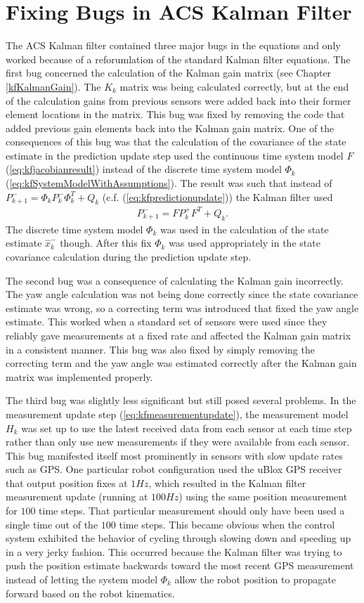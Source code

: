 \section{Fixing Bugs in ACS Kalman Filter}
\label{sec:kfBugs}
The ACS Kalman filter contained three major bugs in the equations and only worked because of a reforumlation of the standard Kalman filter equations. The first bug concerned the calculation of the Kalman gain matrix (see Chapter \ref{kfKalmanGain}). The $K_k$ matrix was being calculated correctly, but at the end of the calculation gains from previous sensors were added back into their former element locations in the matrix. This bug was fixed by removing the code that added previous gain elements back into the Kalman gain matrix. One of the consequences of this bug was that the calculation of the covariance of the state estimate in the prediction update step used the continuous time system model $F$ (\ref{eq:kfjacobianresult}) instead of the discrete time system model $\Phi_k$ (\ref{eq:kfSystemModelWithAssumptions}). The result was such that instead of $P_{k+1}^- = \Phi_kP_k^-\Phi_k^T + Q_k$ (c.f. (\ref{eq:kfpredictionupdate})) the Kalman filter used
\begin{align*}
P_{k+1}^- = FP_k^+F^T + Q_k.
\end{align*}
The discrete time system model $\Phi_k$ was used in the calculation of the state estimate $\hat{x}_k^-$ though. After this fix $\Phi_k$ was used appropriately in the state covariance calculation during the prediction update step.

The second bug was a consequence of calculating the Kalman gain incorrectly. The yaw angle calculation was not being done correctly since the state covariance estimate was wrong, so a correcting term was introduced that fixed the yaw angle estimate. This worked when a standard set of sensors were used since they reliably gave measurements at a fixed rate and affected the Kalman gain matrix in a consistent manner. This bug was also fixed by simply removing the correcting term and the yaw angle was estimated correctly after the Kalman gain matrix was implemented properly.

The third bug was slightly less significant but still posed several problems. In the measurement update step (\ref{eq:kfmeasurementupdate}), the measurement model $H_k$ was set up to use the latest received data from each sensor at each time step rather than only use new measurements if they were available from each sensor. This bug manifested itself most prominently in sensors with slow update rates such as GPS. One particular robot configuration used the uBlox GPS receiver that output position fixes at $1 Hz$, which resulted in the Kalman filter measurement update (running at $100 Hz$) using the same position measurement for $100$ time steps. That particular measurement should only have been used a single time out of the $100$ time steps. This became obvious when the control system exhibited the behavior of cycling through slowing down and speeding up in a very jerky fashion. This occurred because the Kalman filter was trying to push the position estimate backwards toward the most recent GPS measurement instead of letting the system model $\Phi_k$ allow the robot position to propagate forward based on the robot kinematics.

